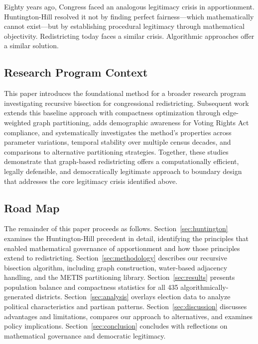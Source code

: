 Eighty years ago, Congress faced an analogous legitimacy crisis in apportionment. Huntington-Hill resolved it not by finding perfect fairness—which mathematically cannot exist—but by establishing procedural legitimacy through mathematical objectivity. Redistricting today faces a similar crisis. Algorithmic approaches offer a similar solution.

\subsection{Research Program Context}

This paper introduces the foundational method for a broader research program investigating recursive bisection for congressional redistricting. Subsequent work extends this baseline approach with compactness optimization through edge-weighted graph partitioning, adds demographic awareness for Voting Rights Act compliance, and systematically investigates the method's properties across parameter variations, temporal stability over multiple census decades, and comparisons to alternative partitioning strategies. Together, these studies demonstrate that graph-based redistricting offers a computationally efficient, legally defensible, and democratically legitimate approach to boundary design that addresses the core legitimacy crisis identified above.

\subsection{Road Map}

The remainder of this paper proceeds as follows. Section~\ref{sec:huntington} examines the Huntington-Hill precedent in detail, identifying the principles that enabled mathematical governance of apportionment and how those principles extend to redistricting. Section~\ref{sec:methodology} describes our recursive bisection algorithm, including graph construction, water-based adjacency handling, and the METIS partitioning library. Section~\ref{sec:results} presents population balance and compactness statistics for all 435 algorithmically-generated districts. Section~\ref{sec:analysis} overlays election data to analyze political characteristics and partisan patterns. Section~\ref{sec:discussion} discusses advantages and limitations, compares our approach to alternatives, and examines policy implications. Section~\ref{sec:conclusion} concludes with reflections on mathematical governance and democratic legitimacy.
